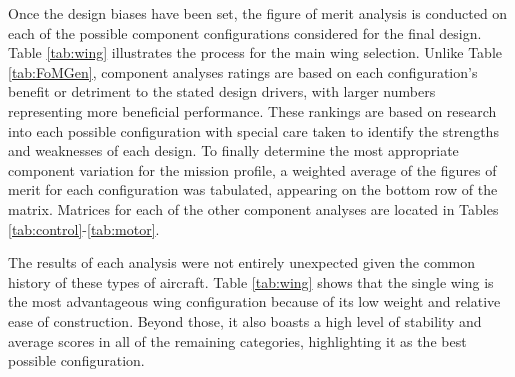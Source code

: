 \documentclass[titlepage]{article}
\begin{document}
\begin{appendices}
Once the design biases have been set, the figure of merit analysis is conducted on each of the possible component configurations considered for the final design. Table \ref{tab:wing} illustrates the process for the main wing selection. Unlike Table \ref{tab:FoMGen}, component analyses ratings are based on each configuration's benefit or detriment to the stated design drivers, with larger numbers representing more beneficial performance. These rankings are based on research into each possible configuration with special care taken to identify the strengths and weaknesses of each design. To finally determine the most appropriate component variation for the mission profile, a weighted average of the figures of merit for each configuration was tabulated, appearing on the bottom row of the matrix. Matrices for each of the other component analyses are located in Tables \ref{tab:control}-\ref{tab:motor}.

\begin{table}[h!]
\caption{Wing Design Matrix}
\label{tab:wing}
\end{table}

The results of each analysis were not entirely unexpected given the common history of these types of aircraft. Table \ref{tab:wing} shows that the single wing is the most advantageous wing configuration because of its low weight and relative ease of construction. Beyond those, it also boasts a high level of stability and average scores in all of the remaining categories, highlighting it as the best possible configuration.


\end{appendices}
\end{document}
